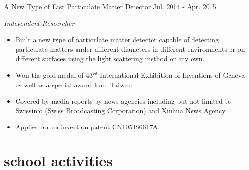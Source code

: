 \documentclass[hidelinks__VERSION__]{adamyi-cv} %
\begin{document}
\begin{entrylist}
\entry
{A New Type of Fast Particulate Matter Detector}
{Jul. 2014 - Apr. 2015}
{\emph{Independent Researcher}
\begin{itemize}
\item Built a new type of particulate matter detector capable of detecting particulate matters under different diameters in different environments or on different surfaces using the light scattering method on my own.
\item Won the gold medal of 43$^{rd}$ International Exhibition of Inventions of Geneva as well as a special award from Taiwan.
\item Covered by media reports by news agencies including but not limited to  Swissinfo (Swiss Broadcasting Corporation) and Xinhua News Agency.
\item Applied for an invention patent CN105486617A.
\end{itemize}}


\end{entrylist}




\section{school activities}
\end{document}
